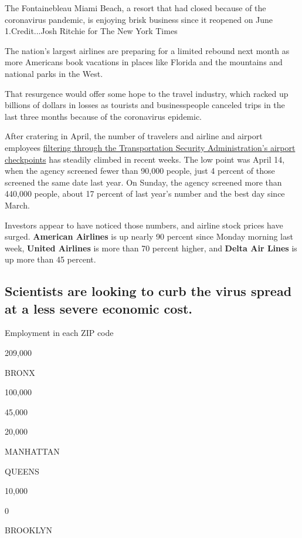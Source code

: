 The Fontainebleau Miami Beach, a resort that had closed because of the
coronavirus pandemic, is enjoying brisk business since it reopened on
June 1.Credit...Josh Ritchie for The New York Times

The nation's largest airlines are preparing for a limited rebound next
month as more Americans book vacations in places like Florida and the
mountains and national parks in the West.

That resurgence would offer some hope to the travel industry, which
racked up billions of dollars in losses as tourists and businesspeople
canceled trips in the last three months because of the coronavirus
epidemic.

After cratering in April, the number of travelers and airline and
airport employees
\href{https://www.tsa.gov/coronavirus/passenger-throughput}{filtering
through the Transportation Security Administration's airport
checkpoints} has steadily climbed in recent weeks. The low point was
April 14, when the agency screened fewer than 90,000 people, just 4
percent of those screened the same date last year. On Sunday, the agency
screened more than 440,000 people, about 17 percent of last year's
number and the best day since March.

Investors appear to have noticed those numbers, and airline stock prices
have surged. \textbf{American Airlines} is up nearly 90 percent since
Monday morning last week, \textbf{United Airlines} is more than 70
percent higher, and \textbf{Delta Air Lines} is up more than 45 percent.

\hypertarget{scientists-are-looking-to-curb-the-virus-spread-at-a-less-severe-economic-cost}{%
\subsection{Scientists are looking to curb the virus spread at a less
severe economic
cost.}\label{scientists-are-looking-to-curb-the-virus-spread-at-a-less-severe-economic-cost}}

Employment in each ZIP code

209,000

BRONX

100,000

45,000

20,000

MANHATTAN

QUEENS

10,000

0

BROOKLYN

